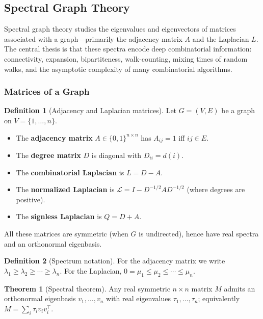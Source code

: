 \documentclass{article}
\theoremstyle{definition}
\newtheorem{theorem}{Theorem}
\newtheorem{definition}{Definition}
\begin{document}
\subsection{Spectral Graph Theory}\label{subsec:spectral}

Spectral graph theory studies the eigenvalues and eigenvectors of
matrices associated with a graph---primarily the adjacency matrix
$A$ and the Laplacian $L$. The central thesis is that these spectra
encode deep combinatorial information: connectivity, expansion,
bipartiteness, walk-counting, mixing times of random walks, and the
asymptotic complexity of many combinatorial algorithms.

\subsubsection{Matrices of a Graph}

\begin{definition}[Adjacency and Laplacian matrices]
Let $G = (V, E)$ be a graph on $V = \{1, \dots, n\}$.
\begin{itemize}
  \item The \textbf{adjacency matrix} $A \in \{0, 1\}^{n \times n}$
        has $A_{ij} = 1$ iff $ij \in E$.
  \item The \textbf{degree matrix} $D$ is diagonal with $D_{ii} = d(i)$.
  \item The \textbf{combinatorial Laplacian} is $L = D - A$.
  \item The \textbf{normalized Laplacian} is
        $\mathcal L = I - D^{-1/2} A D^{-1/2}$ (where degrees are
        positive).
  \item The \textbf{signless Laplacian} is $Q = D + A$.
\end{itemize}
All these matrices are symmetric (when $G$ is undirected), hence have
real spectra and an orthonormal eigenbasis.
\end{definition}

\begin{definition}[Spectrum notation]
For the adjacency matrix we write
$\lambda_1 \ge \lambda_2 \ge \cdots \ge \lambda_n$. For the Laplacian,
$0 = \mu_1 \le \mu_2 \le \cdots \le \mu_n$.
\end{definition}

\begin{theorem}[Spectral theorem]
Any real symmetric $n \times n$ matrix $M$ admits an orthonormal
eigenbasis $v_1, \dots, v_n$ with real eigenvalues $\tau_1, \dots, \tau_n$;
equivalently $M = \sum_i \tau_i v_i v_i^\top$.
\end{theorem}
\end{document}
